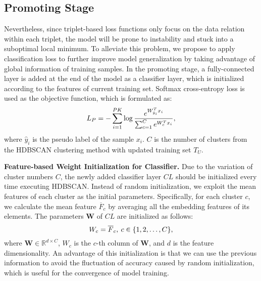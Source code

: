 \documentclass[10pt,twocolumn,letterpaper]{article}
\begin{document}
\subsection{Promoting Stage}
Nevertheless, since triplet-based loss functions only focus on the data relation within each triplet, the model will be prone to instability and stuck into a suboptimal local minimum. 
To alleviate this problem, we propose to apply classification loss to further improve model generalization by taking advantage of global information of training samples. 
In the promoting stage, a fully-connected layer is added at the end of the model as a classifier layer, which is initialized according to the features of current training set. Softmax cross-entropy loss is used as the objective function, which is formulated as:
\begin{equation}
\setlength{\abovedisplayskip}{0.1cm}
\setlength{\belowdisplayskip}{0.1cm}
L_{P} = -\sum^{PK}_{i=1} \log \frac{e^{W^T_{\hat{y}_{i}}x_{i}}}{\sum_{c=1}^{C}e^{W^T_{c}x_{i}}},
\label{progressiveloss}
\end{equation}
where $\hat{y}_{i}$ is the pseudo label of the sample $x_{i}$. $C$ is the number of clusters from the  HDBSCAN clustering method with updated training set $T_{U}$.

\textbf{Feature-based Weight Initialization for Classifier.} 
Due to the variation of cluster numbers $C$, the newly added classifier layer $CL$ should be initialized every time executing HDBSCAN. Instead of random initialization, we exploit the mean features of each cluster as the initial parameters. Specifically, for each cluster $c$, we calculate the mean feature $\overline{F}_{c}$ by averaging all the embedding features of its elements. The parameters $\mathbf{W}$ of $CL$ are initialized as follows:
\begin{equation}
\setlength{\abovedisplayskip}{0.1cm}
\setlength{\belowdisplayskip}{0.1cm}
W_{c} = \overline{F}_{c}, \: c\in \{1, 2, \dots, C\},
\label{intialclassifier}
\end{equation}
where $\mathbf{W}\in \mathbb{R}^{d \times C}$, $W_{c}$ is the $c$-th column of $\mathbf{W}$, and $d$ is the feature dimensionality. 
An advantage of this initialization is that we can use the previous information to avoid the fluctuation of accuracy caused by random initialization, which is useful for the convergence of model training.
\end{document}
